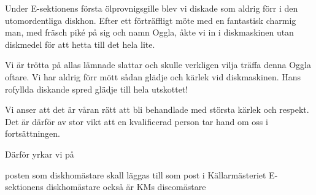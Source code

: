 \documentclass[../_main/handlingar.tex]{subfiles}
\begin{document}

Under E-sektionens första ölprovnigsgille blev vi diskade som aldrig förr i den utomordentliga diskhon. Efter ett förträffligt möte med en fantastisk charmig man, med fräsch piké på sig och namn Oggla, åkte vi in i diskmaskinen utan diskmedel för att hetta till det hela lite.

Vi är trötta på allas lämnade slattar och skulle verkligen vilja träffa denna Oggla oftare. Vi har aldrig förr mött sådan glädje och kärlek vid diskmaskinen. Hans rofyllda diskande spred glädje till hela utskottet!

Vi anser att det är våran rätt att bli behandlade med största kärlek och respekt. Det är därför av stor vikt att en kvalificerad person tar hand om oss i fortsättningen.

Därför yrkar vi på

\begin{attsatser}
    \att posten som diskhomästare skall läggas till som post i Källarmästeriet
    \att E-sektionens diskhomästare också är KMs discomästare
\end{attsatser}

\begin{signatures}{1}
    \signature{Ölglasen}{}
\end{signatures}
\end{document}
